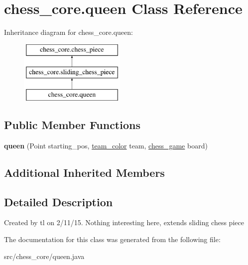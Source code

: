\hypertarget{classchess__core_1_1queen}{}\section{chess\+\_\+core.\+queen Class Reference}
\label{classchess__core_1_1queen}
Inheritance diagram for chess\+\_\+core.\+queen\+:\begin{figure}[H]
\begin{center}
\leavevmode
\includegraphics[height=3.000000cm]{classchess__core_1_1queen}
\end{center}
\end{figure}
\subsection*{Public Member Functions}
\begin{DoxyCompactItemize}
\item 
\hypertarget{classchess__core_1_1queen_ad308e56e5b4cb22ee9fb21ba990440ab}{}{\bfseries queen} (Point starting\+\_\+pos, \hyperlink{enumchess__core_1_1team__color}{team\+\_\+color} team, \hyperlink{classchess__core_1_1chess__game}{chess\+\_\+game} board)\label{classchess__core_1_1queen_ad308e56e5b4cb22ee9fb21ba990440ab}

\end{DoxyCompactItemize}
\subsection*{Additional Inherited Members}


\subsection{Detailed Description}
Created by tl on 2/11/15. Nothing interesting here, extends sliding chess piece 

The documentation for this class was generated from the following file\+:\begin{DoxyCompactItemize}
\item 
src/chess\+\_\+core/queen.\+java\end{DoxyCompactItemize}
